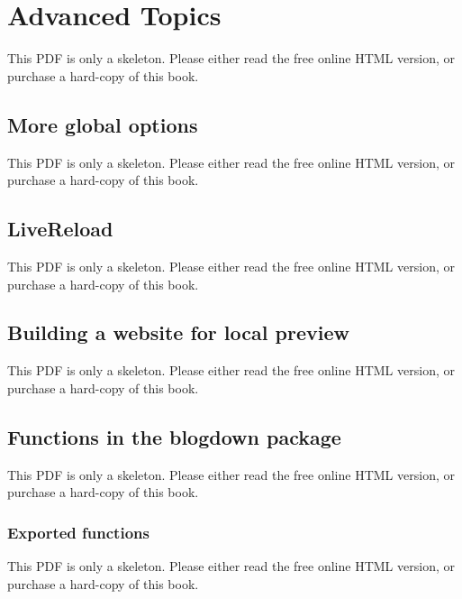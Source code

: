 \documentclass[
  12pt,
]{krantz}
\begin{document}
\chapter{Advanced Topics}\label{advanced-topics}

This PDF is only a skeleton. Please either read the free online HTML version, or purchase a hard-copy of this book.

\section{More global options}\label{more-global-options}

This PDF is only a skeleton. Please either read the free online HTML version, or purchase a hard-copy of this book.

\begin{table}\caption{\label{tab:global-options2}A few more advanced global options.}\end{table}

\section{LiveReload}\label{livereload}

This PDF is only a skeleton. Please either read the free online HTML version, or purchase a hard-copy of this book.

\section{Building a website for local preview}\label{local-preview}

This PDF is only a skeleton. Please either read the free online HTML version, or purchase a hard-copy of this book.

\section{Functions in the blogdown package}\label{functions}

This PDF is only a skeleton. Please either read the free online HTML version, or purchase a hard-copy of this book.

\subsection{Exported functions}\label{exported-functions}

This PDF is only a skeleton. Please either read the free online HTML version, or purchase a hard-copy of this book.
\end{document}
